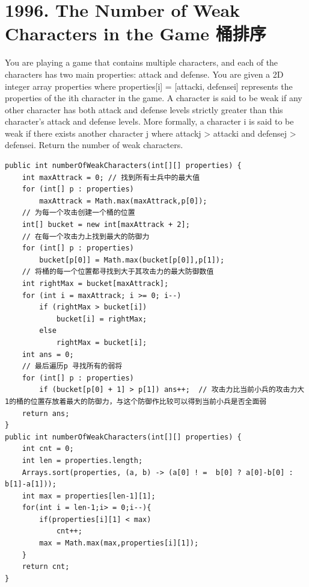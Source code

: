 \documentclass[9pt, b5paaper]{book}
\begin{document}
\section{1996. The Number of Weak Characters in the Game 桶排序}
\label{sec-3-1}
You are playing a game that contains multiple characters, and each of the characters has two main properties: attack and defense. You are given a 2D integer array properties where properties[i] = [attacki, defensei] represents the properties of the ith character in the game.
A character is said to be weak if any other character has both attack and defense levels strictly greater than this character's attack and defense levels. More formally, a character i is said to be weak if there exists another character j where attackj > attacki and defensej > defensei.
Return the number of weak characters.
\begin{verbatim}
public int numberOfWeakCharacters(int[][] properties) {
    int maxAttrack = 0; // 找到所有士兵中的最大值
    for (int[] p : properties)
        maxAttrack = Math.max(maxAttrack,p[0]);
    // 为每一个攻击创建一个桶的位置
    int[] bucket = new int[maxAttrack + 2];     
    // 在每一个攻击力上找到最大的防御力
    for (int[] p : properties)
        bucket[p[0]] = Math.max(bucket[p[0]],p[1]);
    // 将桶的每一个位置都寻找到大于其攻击力的最大防御数值
    int rightMax = bucket[maxAttrack];
    for (int i = maxAttrack; i >= 0; i--) 
        if (rightMax > bucket[i])
            bucket[i] = rightMax;
        else
            rightMax = bucket[i];
    int ans = 0;
    // 最后遍历p 寻找所有的弱将
    for (int[] p : properties)
        if (bucket[p[0] + 1] > p[1]) ans++;  // 攻击力比当前小兵的攻击力大1的桶的位置存放着最大的防御力，与这个防御作比较可以得到当前小兵是否全面弱
    return ans;
}
public int numberOfWeakCharacters(int[][] properties) {
    int cnt = 0;
    int len = properties.length;
    Arrays.sort(properties, (a, b) -> (a[0] ! =  b[0] ? a[0]-b[0] : b[1]-a[1]));
    int max = properties[len-1][1];
    for(int i = len-1;i> = 0;i--){
        if(properties[i][1] < max)
            cnt++;
        max = Math.max(max,properties[i][1]);
    }
    return cnt;
}
\end{verbatim}
\end{document}

